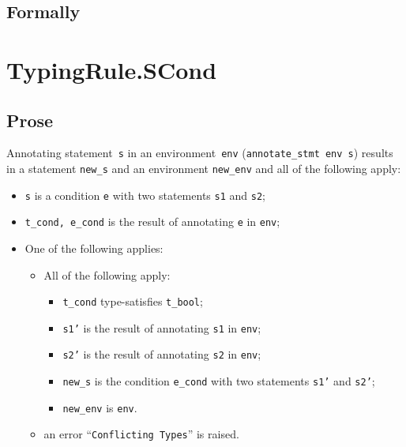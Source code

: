 \documentclass{book}
\begin{document}
\begin{emptyformal}
    \subsection{Formally}
\end{emptyformal}


\section{TypingRule.SCond \label{sec:TypingRule.SCond}}

  \subsection{Prose}
Annotating statement~\texttt{s} in an environment~\texttt{env}
(\texttt{annotate\_stmt env s}) results in a statement \texttt{new\_s} and an
environment \texttt{new\_env} and all of the following apply:
   \begin{itemize}
   \item \texttt{s} is a condition \texttt{e} with two statements \texttt{s1} and \texttt{s2};
   \item \texttt{t\_cond, e\_cond} is the result of annotating \texttt{e} in \texttt{env};
   \item One of the following applies:
     \begin{itemize}
     \item All of the following apply:
       \begin{itemize}
       \item \texttt{t\_cond} type-satisfies \texttt{t\_bool};
       \item \texttt{s1'} is the result of annotating \texttt{s1} in \texttt{env};
       \item \texttt{s2'} is the result of annotating \texttt{s2} in \texttt{env};
       \item \texttt{new\_s} is the condition \texttt{e\_cond} with two statements \texttt{s1'} and \texttt{s2'};
       \item \texttt{new\_env} is \texttt{env}.
       \end{itemize}
     \item an error ``\texttt{Conflicting Types}'' is raised.
     \end{itemize}
   \end{itemize}
\end{document}
